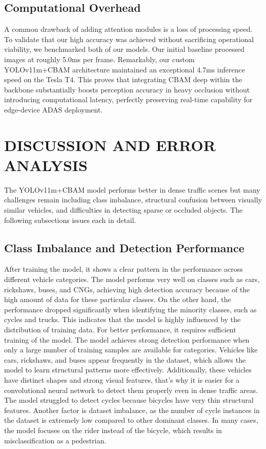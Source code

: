 \documentclass[sigconf]{acmart}
\begin{document}
\subsection{Computational Overhead}

A common drawback of adding attention modules is a loss of processing speed. To validate that our high accuracy was achieved without sacrificing operational viability, we benchmarked both of our models. Our initial baseline processed images at roughly 5.0ms per frame. Remarkably, our custom YOLOv11m+CBAM architecture maintained an exceptional 4.7ms inference speed on the Tesla T4. This proves that integrating CBAM deep within the backbone substantially boosts perception accuracy in heavy occlusion without introducing computational latency, perfectly preserving real-time capability for edge-device ADAS deployment.

\section{DISCUSSION AND ERROR ANALYSIS}
The YOLOv11m+CBAM model performs better in dense traffic scenes but many challenges remain including class imbalance, structural confusion between visually similar vehicles, and difficulties in detecting sparse or occluded objects. The following subsections issues each in detail.

\subsection{Class Imbalance and Detection Performance}

After training the model, it shows a clear pattern in the performance across different vehicle categories. The model performs very well on classes such as cars, rickshaws, buses, and CNGs, achieving high detection accuracy because of the high amount of data for these particular classes. On the other hand, the performance dropped significantly when identifying the minority classes, such as cycles and trucks. This indicates that the model is highly influenced by the distribution of training data. For better performance, it requires sufficient training of the model. The model achieves strong detection performance when only a large number of training samples are available for categories. Vehicles like cars, rickshaws, and buses appear frequently in the dataset, which allows the model to learn structural patterns more effectively. Additionally, these vehicles have distinct shapes and strong visual features, that's why it is easier for a convolutional neural network to detect them properly even in dense traffic areas. The model struggled to detect cycles because bicycles have very thin structural features. Another factor is dataset imbalance, as the number of cycle instances in the dataset is extremely low compared to other dominant classes. In many cases, the model focuses on the rider instead of the bicycle, which results in misclassification as a pedestrian.
\end{document}
